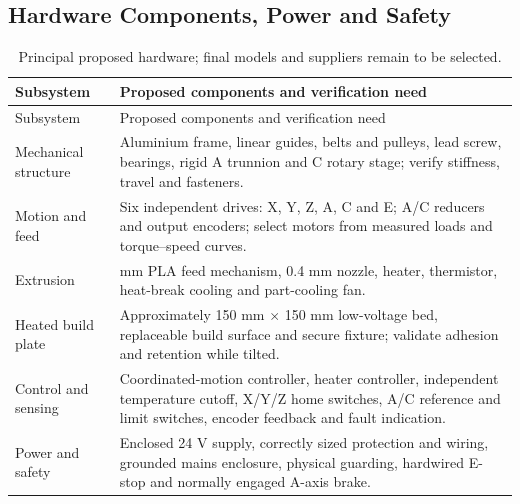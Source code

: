 \documentclass[12pt,a4paper]{article}
\begin{document}
\Needspace{310pt}
\subsection{Hardware Components, Power and Safety}\label{hardware-components-power-and-safety}

\begingroup
\footnotesize
\setlength{\tabcolsep}{4pt}
\renewcommand{\arraystretch}{1.12}
\begin{longtable}[]{@{}
  >{\raggedright\arraybackslash}p{}
  >{\raggedright\arraybackslash}p{}@{}}
\caption{Principal proposed hardware; final models and suppliers remain to be selected.}\tabularnewline
\toprule\noalign{}
\begin{minipage}[b]{\linewidth}\raggedright
Subsystem
\end{minipage} & \begin{minipage}[b]{\linewidth}\raggedright
Proposed components and verification need
\end{minipage} \\
\midrule\noalign{}
\endfirsthead
\toprule\noalign{}
\begin{minipage}[b]{\linewidth}\raggedright
Subsystem
\end{minipage} & \begin{minipage}[b]{\linewidth}\raggedright
Proposed components and verification need
\end{minipage} \\
\midrule\noalign{}
\endhead
\bottomrule\noalign{}
\endlastfoot
Mechanical structure & Aluminium frame, linear guides, belts and pulleys, lead screw, bearings, rigid A
  trunnion and C rotary stage; verify stiffness, travel and fasteners. \\
Motion and feed & Six independent drives: X, Y, Z, A, C and E; A/C reducers and output encoders; select
  motors from measured loads and torque--speed curves. \\
Extrusion & 1.75 mm PLA feed mechanism, 0.4 mm nozzle, heater, thermistor, heat-break cooling and
  part-cooling fan. \\
Heated build plate & Approximately 150 mm \ensuremath{\times} 150 mm low-voltage bed, replaceable build
  surface and secure fixture; validate adhesion and retention while tilted. \\
Control and sensing & Coordinated-motion controller, heater controller, independent temperature cutoff,
  X/Y/Z home switches, A/C reference and limit switches, encoder feedback and fault indication. \\
Power and safety & Enclosed 24 V supply, correctly sized protection and wiring, grounded mains enclosure,
  physical guarding, hardwired E-stop and normally engaged A-axis brake. \\
\end{longtable}
\endgroup
\end{document}
